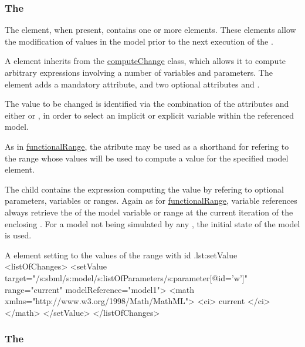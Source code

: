 \subsubsection{The }
\label{sec:changes}
\label{class:setValue}

The  element, when present, contains one or more  elements.
These elements allow the modification of values in the model prior to the next execution of the .

A  element inherits from the \hyperref[class:computeChange]{computeChange} class, which allows it to compute arbitrary expressions involving a number of variables and parameters.
The element  adds a mandatory  attribute, and two optional attributes  and .

The value to be changed is identified via the combination of the attributes  and either  or , in order to select an implicit or explicit variable within the referenced model.

As in \hyperref[class:functionalRange]{functionalRange}, the atribute  may be used as a shorthand for refering to the range whose values will be used to compute a value for the specified model element.

The child  contains the expression computing the value by refering to optional parameters, variables or ranges.
Again as for \hyperref[class:functionalRange]{functionalRange}, variable references always retrieve the  of the model variable or range at the current iteration of the enclosing .
For a model not being simulated by any , the initial state of the model is used.

\begin{myXmlLst}{A  element setting  to the values of the range with id .}{lst:setValue}
  <listOfChanges>
    <setValue target="/s:sbml/s:model/s:listOfParameters/s:parameter[@id='w']"
              range="current" modelReference="model1">
      <math xmlns="http://www.w3.org/1998/Math/MathML">
        <ci> current </ci>
      </math>
    </setValue>
  </listOfChanges>
\end{myXmlLst}


\subsubsection{The }
\label{class:subTask}

